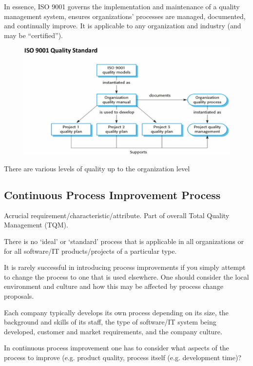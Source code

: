 \documentclass[]{project_plan}
\begin{document}
In essence, ISO 9001 governs the implementation and maintenance of a quality management system,
ensures organizations’ processes are managed, documented, and continually improve. It is applicable to any
organization and industry (and may be “certified”).

\begin{figure}[H]
  \centering
  \includegraphics[width=\linewidth]{ISO 9001 Quality Standard.png}
\end{figure}

There are various levels of quality up to the organization
level

\newpage

\subsection{Continuous Process Improvement Process}

Acrucial requirement/characteristic/attribute. Part of overall Total Quality Management (TQM).

There is no ‘ideal’ or ‘standard’ process that is applicable in all organizations or for all software/IT
products/projects of a particular type.

It is rarely successful in introducing process improvements
if you simply attempt to change the process to one that is used elsewhere. One should consider
the local environment and culture and how this may be affected by process change proposals.

Each company typically develops its own process depending on its size, the background and skills
of its staff, the type of software/IT system being developed, customer and market requirements,
and the company culture.

In continuous process improvement one has to consider what aspects of the process to improve
(e.g. product quality, process itself (e.g. development time)?
\end{document}
